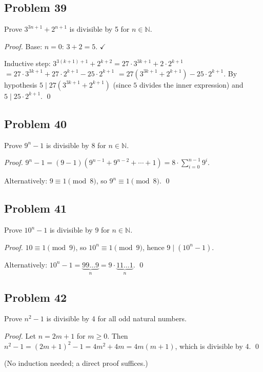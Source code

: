 \subsection*{Problem 39}
Prove $3^{3n+1} + 2^{n+1}$ is divisible by 5 for $n \in \mathbb{N}$.

\textit{Proof.} Base: $n=0$: $3 + 2 = 5$. $\checkmark$

Inductive step: $3^{3(k+1)+1} + 2^{k+2} = 27 \cdot 3^{3k+1} + 2 \cdot 2^{k+1}$
$= 27 \cdot 3^{3k+1} + 27 \cdot 2^{k+1} - 25 \cdot 2^{k+1}$
$= 27(3^{3k+1} + 2^{k+1}) - 25 \cdot 2^{k+1}$.
By hypothesis $5 \mid 27(3^{3k+1} + 2^{k+1})$ (since $5$ divides the inner expression) and $5 \mid 25 \cdot 2^{k+1}$. \qed

\subsection*{Problem 40}
Prove $9^n - 1$ is divisible by 8 for $n \in \mathbb{N}$.

\textit{Proof.} $9^n - 1 = (9-1)(9^{n-1} + 9^{n-2} + \cdots + 1) = 8 \cdot \sum_{i=0}^{n-1} 9^i$.

Alternatively: $9 \equiv 1 \pmod{8}$, so $9^n \equiv 1 \pmod{8}$. \qed

\subsection*{Problem 41}
Prove $10^n - 1$ is divisible by 9 for $n \in \mathbb{N}$.

\textit{Proof.} $10 \equiv 1 \pmod{9}$, so $10^n \equiv 1 \pmod{9}$, hence $9 \mid (10^n - 1)$.

Alternatively: $10^n - 1 = \underbrace{99\ldots9}_{n} = 9 \cdot \underbrace{11\ldots1}_{n}$. \qed

\subsection*{Problem 42}
Prove $n^2 - 1$ is divisible by 4 for all odd natural numbers.

\textit{Proof.} Let $n = 2m+1$ for $m \ge 0$. Then $n^2 - 1 = (2m+1)^2 - 1 = 4m^2 + 4m = 4m(m+1)$, which is divisible by 4. \qed

(No induction needed; a direct proof suffices.)

